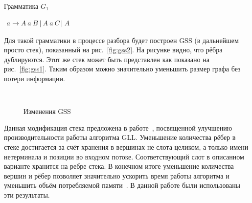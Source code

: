 \begin{listing}
\caption{Грамматика $G_1$}
\label{grmG1}
\centering
$\begin{array}{rl}
a \rightarrow A \ a \ B \ | \ A \ a \ C \ | \ A
\end{array}$

\end{listing}
Для такой грамматики в процессе разбора будет построен GSS (в дальнейшем просто стек), показанный на рис.~\ref{fig:gss2}. На рисунке видно, что рёбра дублируются. Этот же стек может быть представлен как показано на рис.~\ref{fig:gss1}. Таким образом можно значительно уменьшить размер графа без потери информации. 
\begin{figure}
 \centering
    ~
 \caption{Изменения GSS}
\end{figure}

Данная модификация стека предложена в работе~\cite{Afroozeh2015}, посвященной улучшению производительности работы алгоритма GLL. Уменьшение количества рёбер в стеке достигается за счёт хранения в вершинах не слота целиком, а только имени нетерминала и позиции во входном потоке. Соответствующий слот в описанном варианте хранится на ребре стека. В конечном итоге уменьшение количества вершин и рёбер позволяет значительно ускорить время работы алгоритма и уменьшить объём потребляемой памяти~\cite{Afroozeh2015}. В данной работе были использованы эти результаты.

